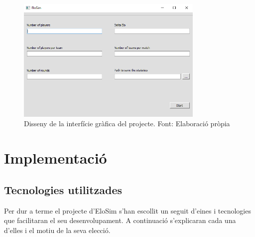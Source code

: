 \documentclass[a4paper]{article}
\begin{document}
\begin{figure} [H]
    \centering
    \includegraphics[width=0.8\textwidth]{images/UiTFG.png}
    \caption[Disseny de la interfície gràfica del projecte]{Disseny de la interfície gràfica del projecte. Font: Elaboració pròpia}
    \label{fig:UiTFG}
\end{figure}

\newpage
\section{Implementació}
\subsection{Tecnologies utilitzades}
Per dur a terme el projecte d'EloSim s'han escollit un seguit d'eines i tecnologies que facilitaran el seu desenvolupament. A continuació s'explicaran cada una d'elles i el motiu de la seva elecció.
\end{document}

